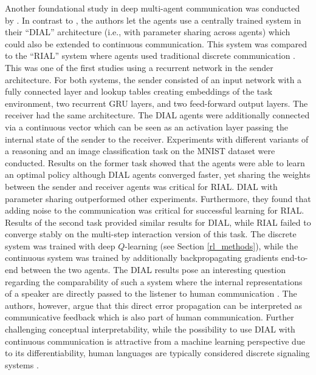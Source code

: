 Another foundational study in deep multi-agent communication was conducted by \cite{foerster2016learning}. In contrast to \cite{lazaridou2016multi}, the authors let the agents use a centrally trained system in their ``DIAL'' architecture (i.e., with parameter sharing across agents)  which could also be extended to continuous communication. This system was compared to the ``RIAL'' system where agents used traditional discrete communication \parencite[][p. 2]{foerster2016learning}. This was one of the first studies using a recurrent network in the sender architecture.
For both systems, the sender consisted of an input network with a fully connected layer and lookup tables creating embeddings of the task environment, two recurrent GRU layers, and two feed-forward output layers.
The receiver had the same architecture. The DIAL agents were additionally connected via a continuous vector which can be seen as an activation layer passing the internal state of the sender to the receiver.
Experiments with different variants of a reasoning and an image classification task on the MNIST dataset were conducted. Results on the former task showed that the agents were able to learn an optimal policy although DIAL agents converged faster, yet sharing the weights between the sender and receiver agents was critical for RIAL. DIAL with parameter sharing outperformed other experiments. Furthermore, they found that adding noise to the communication was critical for successful learning for RIAL. Results of the second task provided similar results for DIAL, while RIAL failed to converge stably on the multi-step interaction version of this task. 
The discrete system was trained with deep $Q$-learning (see Section \ref{rl_methods}), while the continuous system was trained by additionally backpropagating gradients end-to-end between the two agents. 
The DIAL results pose an interesting question regarding the comparability of such a system where the internal representations of a speaker are directly passed to the listener to human communication \parencite[cf.][]{lazaridou2020emergent, hockett1960origin}. The authors, however, argue that this direct error propagation can be interpreted as communicative feedback which is also part of human communication. Further challenging conceptual interpretability, while the possibility to use DIAL with continuous communication is attractive from a machine learning perspective due to its differentiability, human languages are typically considered discrete signaling systems \parencite{hockett1960origin}. 

